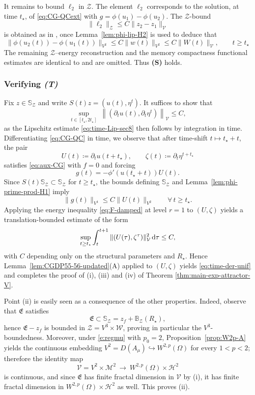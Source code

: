 \documentclass[12pt,leqno]{amsart}
\def\d{{\rm d}}
\def\pt {{\partial_t}}
\theoremstyle{definition}
\numberwithin{equation}{section}
\numberwithin{figure}{section}
\begin{document}
It remains to bound $\ell_2$ in $\mathcal Z$. The element $\ell_2$ corresponds to the solution, at time $t_\star$, of  \eqref{eq:CG-QCext} with $g=\phi(u_1)-\phi(u_2)$.   The $\mathcal Z$-bound
\[
\|\ell_2\|_{\mathcal Z}\le C\|z_2-z_1\|_{\mathcal V}
\]
is obtained as in \cite[\S8]{CGDP2010},  once
Lemma~\ref{lem:phi-lip-H2} is used to deduce that  
\[
\|\phi(u_2(t))-\phi(u_1(t))\|_{{V^2}}\le C\|w(t)\|_{{V^2}}\le C\|W(t)\|_{\mathcal V}, \qquad t\ge t_\star
\]
The remaining 
$\mathcal Z$--energy reconstruction and  the memory compactness functional estimates are identical to \cite[\S8]{CGDP2010} and are omitted.
Thus \textbf{(S)} holds.
\subsubsection*{Verifying \textbf{\emph{(T)}}}
Fix $z\in \mathbb S_{\mathcal Z}$ and write $S(t)z=(u(t),\eta^t)$. 
It suffices to show that \begin{equation}\label{eq:time-der-unif}
\sup_{t\in[t_\star,2t_\star]}\ \left\|(\pt u(t),\pt\eta^t)\right\|_{\mathcal V}\le C, 
\end{equation}
as the Lipschitz estimate \eqref{eq:time-Lip-sec8} then follows by integration in time.
Differentiating \eqref{eq:CG-QC} in time, we observe that after  time-shift $t\mapsto t_\star+t$, the pair
\[
U(t)\coloneqq \pt u(t+t_\star),\qquad \zeta(t)\coloneqq \pt\eta^{t+t_\star}
\]
satisfies 
\eqref{eq:aux-CG} with $f=0$ and forcing
\begin{equation}\label{eq:g-time-der}
g(t)=-\phi'(u(t_\star+t))U( t).
\end{equation}
 Since $S(t)\mathbb S_{\mathcal Z}\subset\mathbb S_{\mathcal Z}$ for $t\ge t_\star$, the bounds
defining $\mathbb S_{\mathcal Z}$ and Lemma~\ref{lem:phi-prime-prod-H1} imply
\[
\|g(t)\|_{{V^1}}\le C\|U(t)\|_{{V^2}}\qquad \forall\,t\ge t_\star.
\]
Applying the energy inequality \eqref{eq:F-damped} at level $r=1$ to $(U,\zeta)$ yields a
translation-bounded estimate of the form
\[
\sup_{t\ge t_\star}\int_t^{t+1}\|(U(\tau),\zeta^\tau)\|_{\mathcal V}^2\,\d\tau \le C,
\]
with $C$ depending only on the structural parameters and $R_\star$.
Hence Lemma~\ref{lem:CGDP55-56-updated}\textup{(A)} applied to $(U,\zeta)$ yields \eqref{eq:time-der-unif} and completes the proof of (i), (iii) and (iv) of Theorem \ref{thm:main-exp-attractor-V}. 

Point (ii) is easily seen as a consequence of the other properties. Indeed,  observe that  $\mathfrak E$ satisfies
\[
\mathfrak E\subset \mathbb S_{\mathcal Z}=z_f+\mathbb B_{\mathcal Z}(R_\star),
\]
hence $\mathfrak E-z_f$ is bounded in $\mathcal Z={V^3}\times \mathcal W$, proving in particular the ${V^3}$-boundedness.
Moreover, under \eqref{e:regmu} with $p_0=2$, Proposition~\ref{prop:W2p-A} yields the continuous embedding
${V^2}=D(A_\mu)\hookrightarrow W^{2,p}(\Omega)$ for every $1<p<2$; therefore the identity map
\[
\mathcal V={V^2}\times \mathcal M^2 \ \longrightarrow\ W^{2,p}(\Omega)\times \mathcal H^2
\]
is continuous, and since $\mathfrak E$ has finite fractal dimension in $\mathcal V$ by (i),
it has finite fractal dimension in $W^{2,p}(\Omega)\times \mathcal H^2$ as well. This proves (ii).
\end{document}
